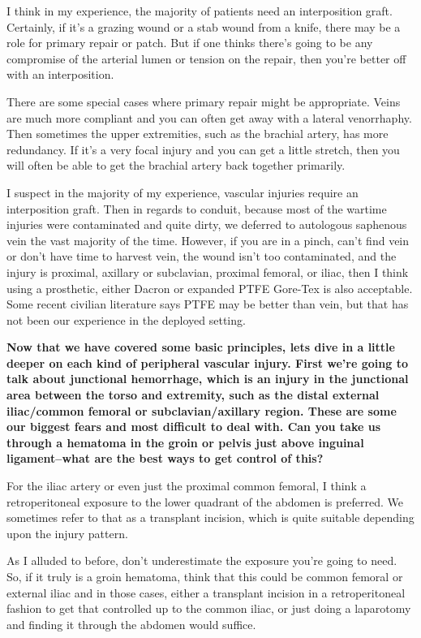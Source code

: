 \documentclass[
]{book}
\begin{document}
I think in my experience, the majority of patients need an interposition
graft. Certainly, if it's a grazing wound or a stab wound from a knife,
there may be a role for primary repair or patch. But if one thinks
there's going to be any compromise of the arterial lumen or tension on
the repair, then you're better off with an interposition. \citep{liang2016, fox2012}

There are some special cases where primary repair might be appropriate.
Veins are much more compliant and you can often get away with a lateral
venorrhaphy. Then sometimes the upper extremities, such as the brachial
artery, has more redundancy. If it's a very focal injury and you can get
a little stretch, then you will often be able to get the brachial artery
back together primarily.

I suspect in the majority of my experience, vascular injuries require an
interposition graft. Then in regards to conduit, because most of the
wartime injuries were contaminated and quite dirty, we deferred to
autologous saphenous vein the vast majority of the time. However, if you
are in a pinch, can't find vein or don't have time to harvest vein, the
wound isn't too contaminated, and the injury is proximal, axillary or
subclavian, proximal femoral, or iliac, then I think using a prosthetic,
either Dacron or expanded PTFE Gore-Tex is also acceptable. Some recent
civilian literature says PTFE may be better than vein, but that has not
been our experience in the deployed setting.

\textbf{Now that we have covered some basic principles, lets dive in a little
deeper on each kind of peripheral vascular injury. First we're going to
talk about junctional hemorrhage, which is an injury in the junctional
area between the torso and extremity, such as the distal external
iliac/common femoral or subclavian/axillary region. These are some our
biggest fears and most difficult to deal with. Can you take us through a
hematoma in the groin or pelvis just above inguinal ligament--what are
the best ways to get control of this?}

For the iliac artery or even just the proximal common femoral, I think a
retroperitoneal exposure to the lower quadrant of the abdomen is
preferred. We sometimes refer to that as a transplant incision, which is
quite suitable depending upon the injury pattern.

As I alluded to before, don't underestimate the exposure you're going to
need. So, if it truly is a groin hematoma, think that this could be
common femoral or external iliac and in those cases, either a transplant
incision in a retroperitoneal fashion to get that controlled up to the
common iliac, or just doing a laparotomy and finding it through the
abdomen would suffice.
\end{document}
